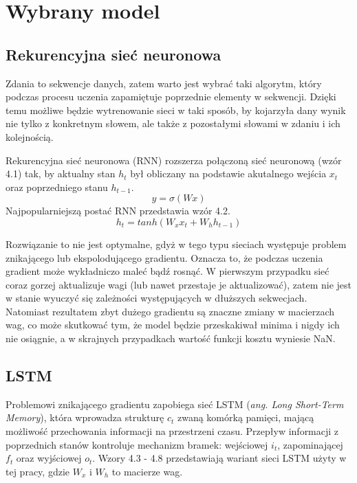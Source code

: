 \chapter{Wybrany model}
\label{cha:model}

\section{Rekurencyjna sieć neuronowa}
\label{sec:rozklad}
 
Zdania to sekwencje danych, zatem warto jest wybrać taki algorytm, który podczas procesu uczenia zapamiętuje poprzednie elementy w sekwencji. Dzięki temu możliwe będzie wytrenowanie sieci w taki sposób, by kojarzyła dany wynik nie tylko z konkretnym słowem, ale także z pozostałymi słowami w zdaniu i ich kolejnością. 

Rekurencyjna sieć neuronowa (RNN) rozszerza połączoną sieć neuronową (wzór 4.1) tak, by aktualny stan  \textit{$h_t$}  był obliczany na podstawie akutalnego wejścia \textit{$x_t$} oraz poprzedniego stanu \textit{$h_{t-1}$}\cite{tai}. 
\begin{equation} y = \sigma(Wx) \end{equation} 
Najpopularniejszą postać RNN przedstawia wzór 4.2.
\begin{equation} h_t = tanh(W_x x_t + W_h h_{t-1}) \end{equation} 

Rozwiązanie to nie jest optymalne, gdyż w tego typu sieciach występuje problem znikającego lub ekspolodującego gradientu\cite{gradient}. Oznacza to, że podczas uczenia gradient może wykładniczo maleć bądź rosnąć. W pierwszym przypadku sieć coraz gorzej aktualizuje wagi (lub nawet przestaje je aktualizować), zatem nie jest w stanie wyuczyć się zależności występujących w dłuższych sekwecjach. Natomiast rezultatem zbyt dużego gradientu są znaczne zmiany w macierzach wag, co może skutkować tym, że model będzie przeskakiwał minima i nigdy ich nie osiągnie, a w skrajnych przypadkach wartość funkcji kosztu wyniesie NaN.

\section{LSTM}
\label{sec:lstm}

Problemowi znikającego gradientu zapobiega sieć LSTM\cite{tai} (\textit{ang. Long Short-Term Memory}), która wprowadza strukturę \textit{$c_t$} zwaną komórką pamięci, mającą możliwość przechowania informacji na przestrzeni czasu. Przepływ informacji z poprzednich stanów kontroluje mechanizm bramek: wejściowej \textit{$i_t$}, zapominającej \textit{$f_t$} oraz wyjściowej \textit{$o_t$}. Wzory 4.3 - 4.8 przedstawiają wariant sieci LSTM użyty w tej pracy, gdzie \textit{$W_x$} i \textit{$W_h$} to macierze wag.


